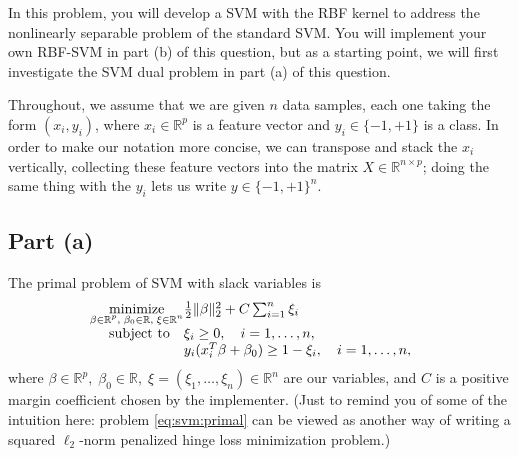 \documentclass{article}
\theoremstyle{remark}
\theoremstyle{definition}
\newcommand{\minimize}{\mathop{\mathrm{minimize}}}
\newcommand{\minimizewrt}[1]{\underset{#1}{\minimize}}
\newcommand{\subjectto}{\mbox{subject to}}
\newcommand{\reals}{\mathbb R}
\begin{document}
In this problem, you will develop a SVM with the RBF kernel to address the nonlinearly separable problem of the standard SVM.
You will implement your own RBF-SVM in part (b) of this question, but as a starting point, we will first investigate the SVM dual problem in part (a) of this question.

Throughout, we assume that we are given $n$ data samples, each one taking the form $(x_i, y_i)$, where $x_i \in \reals^p$ is a feature vector and $y_i \in \{-1,+1\}$ is a class.  In order to make our notation more concise, we can transpose and stack the $x_i$ vertically, collecting these feature vectors into the matrix $X \in \reals^{n \times p}$; doing the same thing with the $y_i$ lets us write $y \in \{-1,+1\}^n$.

\subsection*{Part (a)}
The primal problem of SVM with slack variables is
\begin{equation}
\begin{array}{ll}
\minimizewrt{\mathclap{\beta \in \reals^p, \; \beta_0 \in \reals, \; \xi \in \reals^n}} & \tfrac1{2} \| \beta \|_2^2 + C \sum_{i=1}^{n} \xi_i \\
\subjectto & \xi_i \geq 0,  \quad i=1,\ldots,n, \\
		   & y_i( x_i^T \beta + \beta_0) \geq 1 - \xi_i, \quad i=1,\ldots,n,
\end{array}
\label{eq:svm:primal}
\end{equation}
where $\beta \in \reals^p, \; \beta_0 \in \reals, \; \xi = (\xi_1, \ldots, \xi_n) \in \reals^n$ are our variables, and $C$ is a positive margin coefficient chosen by the implementer.  (Just to remind you of some of the intuition here: problem \eqref{eq:svm:primal} can be viewed as another way of writing a squared $\ell_2$-norm penalized hinge loss minimization problem.)
\end{document}
